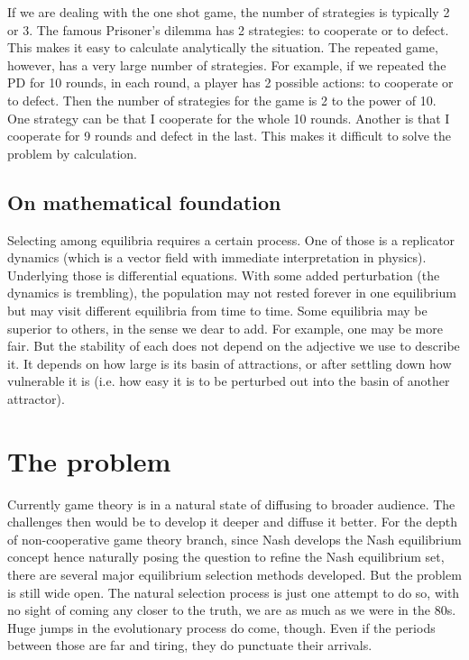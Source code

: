 \documentclass[12.5pt]{report}
\begin{document}
If we are dealing with the one shot game, the number of strategies is typically 2 or 3. The famous Prisoner's dilemma has 2 strategies: to cooperate or to defect. This makes it easy to calculate analytically the situation. The repeated game, however, has a very large number of strategies. For example, if we repeated the PD for 10 rounds, in each round, a player has 2 possible actions: to cooperate or to defect. Then the number of strategies for the game is 2 to the power of 10. One strategy can be that I cooperate for the whole 10 rounds. Another is that I cooperate for 9 rounds and defect in the last. This makes it difficult to solve the problem by calculation.

\subsection{On mathematical foundation}
Selecting among equilibria requires a certain process. One of those is a replicator dynamics (which is a vector field with immediate interpretation in physics). Underlying those is differential equations. With some added perturbation (the dynamics is trembling), the population may not rested forever in one equilibrium but may visit different equilibria from time to time. Some equilibria may be superior to others, in the sense we dear to add. For example, one may be more fair. But the stability of each does not depend on the adjective we use to describe it. It depends on how large is its basin of attractions, or after settling down how vulnerable it is (i.e. how easy it is to be perturbed out into the basin of another attractor).

\section{The problem}
Currently game theory is in a natural state of diffusing to broader audience. The challenges then would be to develop it deeper and diffuse it better. For the depth of non-cooperative game theory branch, since Nash develops the Nash equilibrium concept hence naturally posing the question to refine the Nash equilibrium set, there are several major equilibrium selection methods developed. But the problem is still wide open. The natural selection process is just one attempt to do so, with no sight of coming any closer to the truth, we are as much as we were in the 80s. Huge jumps in the evolutionary process do come, though. Even if the periods between those are far and tiring, they do punctuate their arrivals.\\
\end{document}
